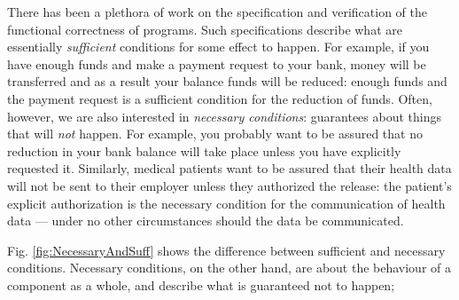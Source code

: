 There has been a plethora of work on the specification and verification of the
functional correctness of programs. Such specifications describe what are
essentially \emph{sufficient} conditions for some
effect to happen. For example, if you have enough funds and make a payment request to your bank, money will be transferred
and as a result your balance funds will be reduced: enough funds and the payment request is a sufficient condition for the
reduction of funds.
Often, however, we are also interested in \emph{necessary conditions}:
guarantees about things that will  \emph{not} happen.
%
For example, you  probably 
want to be assured that no reduction in your bank balance will take place unless you have
explicitly requested it. Similarly, medical patients want  to be assured  that   their health data will not be sent to  their employer  
unless they authorized the release:
the patient's explicit authorization is the
necessary condition for the communication of health data --- under no
other circumstances should the data be communicated.

Fig. \ref{fig:NecessaryAndSuff} shows
the difference between sufficient and necessary conditions. 
Necessary conditions, on the other hand, are about the behaviour of a component
as a whole, 
and describe what is guaranteed not to happen;


 



